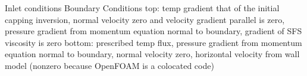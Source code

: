 Inlet conditions
Boundary Conditions
top: temp gradient that of the initial capping inversion, normal velocity zero and velocity gradient parallel is zero, pressure gradient from momentum equation normal to boundary, gradient of SFS viscosity is zero
bottom: prescribed temp flux, pressure gradient from momentum equation normal to boundary, normal velocity zero, horizontal velocity from wall model (nonzero because OpenFOAM is a colocated code)
